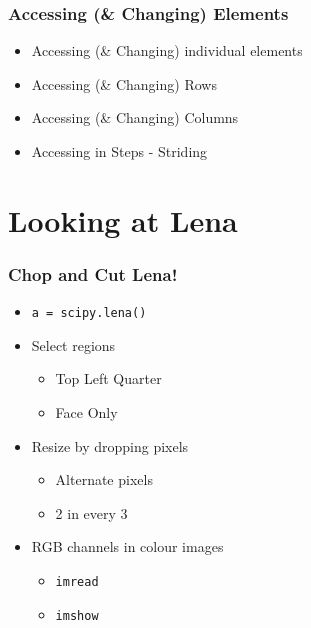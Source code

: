 \documentclass[presentation]{beamer}
\begin{document}
\begin{frame}
\frametitle{Accessing (\& Changing) Elements}
\label{sec-2_5}



\begin{itemize}
\item Accessing (\& Changing) individual elements
\item Accessing (\& Changing) Rows
\item Accessing (\& Changing) Columns
\item Accessing in Steps - Striding
\end{itemize}
\end{frame}
\section{Looking at Lena}
\label{sec-3}
\begin{frame}
\frametitle{Chop and Cut Lena!}
\label{sec-3_1}

\begin{itemize}
\item \texttt{a = scipy.lena()}
\item Select regions

\begin{itemize}
\item Top Left Quarter
\item Face Only
\end{itemize}

\item Resize by dropping pixels

\begin{itemize}
\item Alternate pixels
\item 2 in every 3
\end{itemize}

\item RGB channels in colour images

\begin{itemize}
\item \texttt{imread}
\item \texttt{imshow}
\end{itemize}

\end{itemize}
\end{frame}
\end{document}
